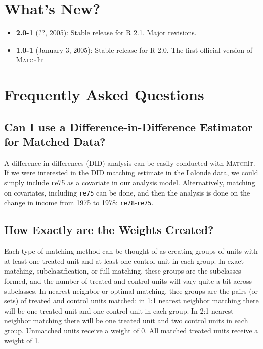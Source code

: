 \documentclass[oneside,letterpaper,titlepage]{article}
\newcommand{\MatchIt}{\textsc{MatchIt}}
\begin{document}

\section{What's New?}

\begin{itemize}
\item \textbf{2.0-1} (??, 2005): Stable release for R 2.1. Major revisions.
\item \textbf{1.0-1} (January 3, 2005): Stable release for R 2.0. The
  first official version of \MatchIt
\end{itemize}




\section{Frequently Asked Questions}

\subsection{Can I use a Difference-in-Difference Estimator for Matched
  Data?}

A difference-in-differences (DID) analysis can be easily conducted
with \MatchIt.  If we were interested in the DID matching estimate in
the Lalonde data, we could simply include {\texttt re75} as a
covariate in our analysis model.  Alternatively, matching on
covariates, including {\tt re75} can be done, and then the analysis is
done on the change in income from 1975 to 1978: {\tt re78}-{\tt re75}.

\subsection{How Exactly are the Weights Created?}
\label{subsec:weights}

Each type of matching method can be thought of as creating groups of
units with at least one treated unit and at least one control unit in
each group.  In exact matching, subclassification, or full matching,
these groups are the subclasses formed, and the number of treated and
control units will vary quite a bit across subclasses.  In nearest
neighbor or optimal matching, thee groups are the pairs (or sets) of
treated and control units matched: in 1:1 nearest neighbor matching
there will be one treated unit and one control unit in each group.  In
2:1 nearest neighbor matching there will be one treated unit and two
control units in each group.  Unmatched units receive a weight of 0.
All matched treated units receive a weight of 1.
\end{document}
